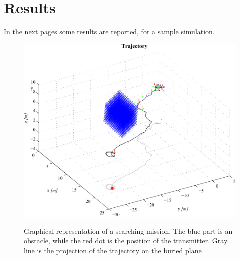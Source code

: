 \FloatBarrier

\section{Results}
In the next pages some results are reported, for a sample simulation.

\begin{figure}[f]
	\centering
	\includegraphics[]{ch4/img/3Dplot.pdf}
\label{fig:3dplot}
\caption{Graphical representation of a searching mission. The blue part is an obstacle, while the red dot is the position of the transmitter. Gray line is the projection of the trajectory on the buried plane}
\end{figure}


